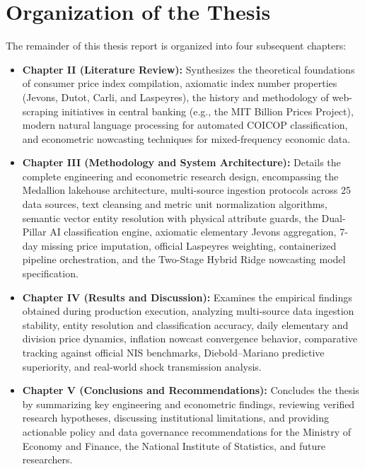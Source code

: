 \section{Organization of the Thesis}
\hs The remainder of this thesis report is organized into four subsequent chapters:
\begin{itemize}
    \item \textbf{Chapter II (Literature Review):} Synthesizes the theoretical foundations of consumer price index compilation, axiomatic index number properties (Jevons, Dutot, Carli, and Laspeyres), the history and methodology of web-scraping initiatives in central banking (e.g., the MIT Billion Prices Project), modern natural language processing for automated COICOP classification, and econometric nowcasting techniques for mixed-frequency economic data.
    \item \textbf{Chapter III (Methodology and System Architecture):} Details the complete engineering and econometric research design, encompassing the Medallion lakehouse architecture, multi-source ingestion protocols across 25 data sources, text cleansing and metric unit normalization algorithms, semantic vector entity resolution with physical attribute guards, the Dual-Pillar AI classification engine, axiomatic elementary Jevons aggregation, 7-day missing price imputation, official Laspeyres weighting, containerized pipeline orchestration, and the Two-Stage Hybrid Ridge nowcasting model specification.
    \item \textbf{Chapter IV (Results and Discussion):} Examines the empirical findings obtained during production execution, analyzing multi-source data ingestion stability, entity resolution and classification accuracy, daily elementary and division price dynamics, inflation nowcast convergence behavior, comparative tracking against official NIS benchmarks, Diebold--Mariano predictive superiority, and real-world shock transmission analysis.
    \item \textbf{Chapter V (Conclusions and Recommendations):} Concludes the thesis by summarizing key engineering and econometric findings, reviewing verified research hypotheses, discussing institutional limitations, and providing actionable policy and data governance recommendations for the Ministry of Economy and Finance, the National Institute of Statistics, and future researchers.
\end{itemize}
